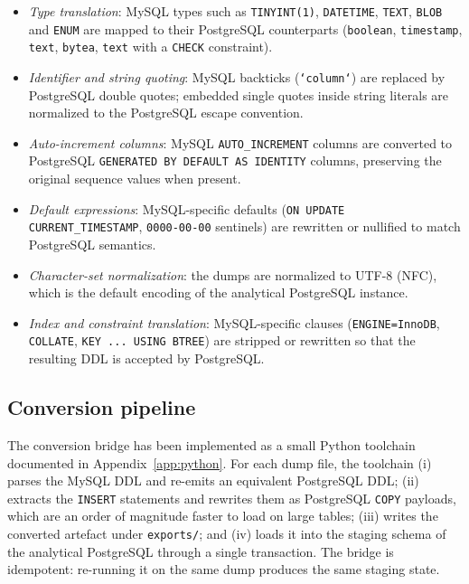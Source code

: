 \begin{itemize}
    \item \emph{Type translation}: MySQL types such as \texttt{TINYINT(1)}, \texttt{DATETIME}, \texttt{TEXT}, \texttt{BLOB} and \texttt{ENUM} are mapped to their PostgreSQL counterparts (\texttt{boolean}, \texttt{timestamp}, \texttt{text}, \texttt{bytea}, \texttt{text} with a \texttt{CHECK} constraint).
    \item \emph{Identifier and string quoting}: MySQL backticks (\texttt{`column`}) are replaced by PostgreSQL double quotes; embedded single quotes inside string literals are normalized to the PostgreSQL escape convention.
    \item \emph{Auto-increment columns}: MySQL \texttt{AUTO\_INCREMENT} columns are converted to PostgreSQL \texttt{GENERATED BY DEFAULT AS IDENTITY} columns, preserving the original sequence values when present.
    \item \emph{Default expressions}: MySQL-specific defaults (\texttt{ON UPDATE CURRENT\_TIMESTAMP}, \texttt{0000-00-00} sentinels) are rewritten or nullified to match PostgreSQL semantics.
    \item \emph{Character-set normalization}: the dumps are normalized to UTF-8 (NFC), which is the default encoding of the analytical PostgreSQL instance.
    \item \emph{Index and constraint translation}: MySQL-specific clauses (\texttt{ENGINE=InnoDB}, \texttt{COLLATE}, \texttt{KEY ... USING BTREE}) are stripped or rewritten so that the resulting DDL is accepted by PostgreSQL.
\end{itemize}

\subsection{Conversion pipeline}
The conversion bridge has been implemented as a small Python toolchain documented in Appendix~\ref{app:python}. For each dump file, the toolchain (i) parses the MySQL DDL and re-emits an equivalent PostgreSQL DDL; (ii) extracts the \texttt{INSERT} statements and rewrites them as PostgreSQL \texttt{COPY} payloads, which are an order of magnitude faster to load on large tables; (iii) writes the converted artefact under \texttt{exports/}; and (iv) loads it into the staging schema of the analytical PostgreSQL through a single transaction. The bridge is idempotent: re-running it on the same dump produces the same staging state.

